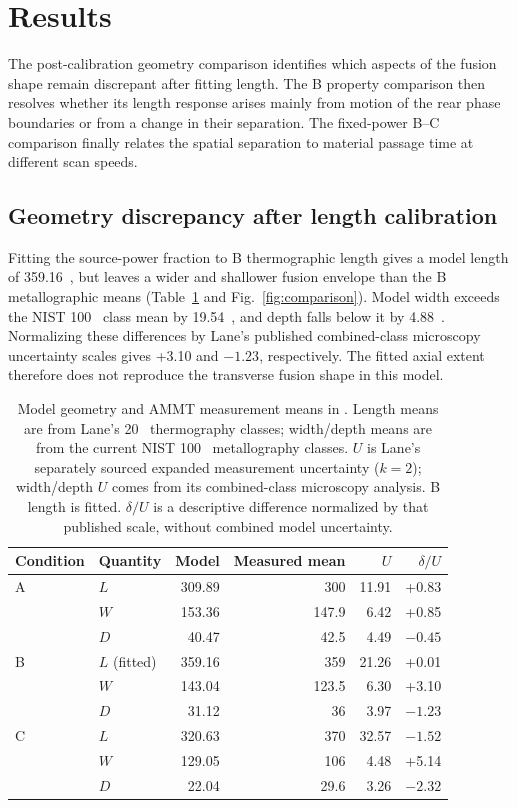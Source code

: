 \section{Results}
The post-calibration geometry comparison identifies which aspects of the fusion shape remain discrepant after fitting length. The B property comparison then resolves whether its length response arises mainly from motion of the rear phase boundaries or from a change in their separation. The fixed-power B--C comparison finally relates the spatial separation to material passage time at different scan speeds.

\subsection{Geometry discrepancy after length calibration}
Fitting the source-power fraction to B thermographic length gives a model length of 359.16~\um{}, but leaves a wider and shallower fusion envelope than the B metallographic means (Table~\ref{tab:geometry} and Fig.~\ref{fig:comparison}). Model width exceeds the NIST 100~\us{} class mean by 19.54~\um{}, and depth falls below it by 4.88~\um. Normalizing these differences by Lane's published combined-class microscopy uncertainty scales gives +3.10 and $-1.23$, respectively. The fitted axial extent therefore does not reproduce the transverse fusion shape in this model.

\begin{table}[htbp]
\centering
\caption{Model geometry and AMMT measurement means in \um. Length means are from Lane's 20~\us{} thermography classes; width/depth means are from the current NIST 100~\us{} metallography classes. $U$ is Lane's separately sourced expanded measurement uncertainty ($k=2$); width/depth $U$ comes from its combined-class microscopy analysis. B length is fitted. $\delta/U$ is a descriptive difference normalized by that published scale, without combined model uncertainty.}
\label{tab:geometry}
\small
\begin{tabular}{llrrrr}
\toprule
Condition & Quantity & Model & Measured mean & $U$ & $\delta/U$\\
\midrule
A & $L$ & 309.89 & 300 & 11.91 & +0.83\\
  & $W$ & 153.36 & 147.9 & 6.42 & +0.85\\
  & $D$ & 40.47 & 42.5 & 4.49 & $-0.45$\\
B & $L$ (fitted) & 359.16 & 359 & 21.26 & +0.01\\
  & $W$ & 143.04 & 123.5 & 6.30 & +3.10\\
  & $D$ & 31.12 & 36 & 3.97 & $-1.23$\\
C & $L$ & 320.63 & 370 & 32.57 & $-1.52$\\
  & $W$ & 129.05 & 106 & 4.48 & +5.14\\
  & $D$ & 22.04 & 29.6 & 3.26 & $-2.32$\\
\bottomrule
\end{tabular}
\end{table}

